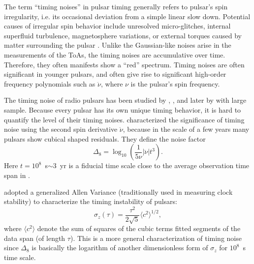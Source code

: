 The term ``timing noises'' in pulsar timing generally refers to pulsar's spin
irregularity, i.e. its occasional deviation from a simple linear slow down. 
Potential causes of irregular spin behavior include unresolved
micro-glitches, internal superfluid turbulence, magnetosphere variations, or external torques caused by matter surrounding the pulsar
\citep{hlk10, ymh+13, ml14}.
Unlike the Gaussian-like noises arise in the measurements of the ToAs, the
timing noises
are accumulative over time. Therefore, they often manifests show a ``red'' 
spectrum. Timing noises are often significant in younger pulsars, and often
give rise to significant high-order frequency polynomials such as
$\ddot{\nu}$, where $\nu$ is the pulsar's spin frequency.

The timing noise of radio pulsars has been studied by \citet{antt94},
\citet{dmhd95}, \citet{mtem97} and later by \citet{hlk10} with large sample. 
Because every pulsar has its own unique timing behavior, it is
hard to quantify the level of their timing noises.
\citet{antt94} characterized the significance of timing noise using the second
spin derivative $\ddot{\nu}$, because in the scale of a few years many
pulsars show cubical shaped residuals. They define the noise factor 
\begin{equation}
\label{eq:delta8}
\Delta_8 = \log_{10}\left(\frac{1}{5\nu}|\ddot{\nu}|t^3\right).
\end{equation}
Here $t=10^8$~s$\sim 3$~yr is a fiducial time scale close to the average observation time span in \citet{antt94}.

\citet{mtem97} adopted a generalized Allen Variance (traditionally used in
measuring clock stability) to characterize the timing instability of pulsars:
\begin{equation}
\label{eq:sigmaz}
\sigma_z(\tau) = \frac{\tau^2}{2\sqrt{5}}\langle c^2 \rangle^{1/2},
\end{equation}
where $\langle c^2\rangle$ denote the sum of squares of the cubic terms fitted segments of
the data span (of length $\tau$).
This is a more general characterization of timing noise since $\Delta_8$ is
basically the logarithm of another dimensionless form of $\sigma_z$ for
$10^8$~s time scale.


